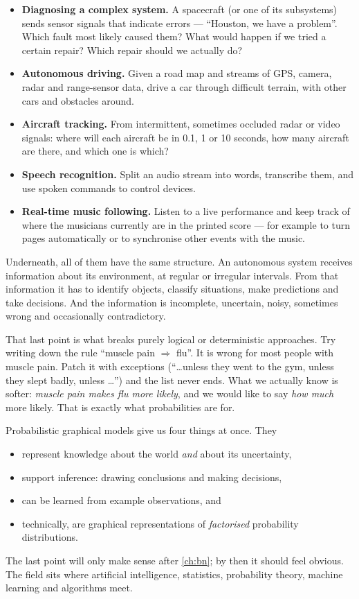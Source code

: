 \documentclass[11pt, oneside]{book}
\begin{document}
\begin{itemize}
  \item \textbf{Diagnosing a complex system.} A spacecraft (or one of its
    subsystems) sends sensor signals that indicate errors --- ``Houston, we
    have a problem''. Which fault most likely caused them? What would happen if
    we tried a certain repair? Which repair should we actually do?
  \item \textbf{Autonomous driving.} Given a road map and streams of GPS,
    camera, radar and range-sensor data, drive a car through difficult terrain,
    with other cars and obstacles around.
  \item \textbf{Aircraft tracking.} From intermittent, sometimes occluded radar
    or video signals: where will each aircraft be in 0.1, 1 or 10 seconds, how
    many aircraft are there, and which one is which?
  \item \textbf{Speech recognition.} Split an audio stream into words,
    transcribe them, and use spoken commands to control devices.
  \item \textbf{Real-time music following.} Listen to a live performance and
    keep track of where the musicians currently are in the printed score ---
    for example to turn pages automatically or to synchronise other events with
    the music.
\end{itemize}

Underneath, all of them have the same structure. An autonomous system receives
information about its environment, at regular or irregular intervals. From
that information it has to identify objects, classify situations, make
predictions and take decisions. And the information is incomplete, uncertain,
noisy, sometimes wrong and occasionally contradictory.

That last point is what breaks purely logical or deterministic approaches. Try
writing down the rule ``muscle pain $\Rightarrow$ flu''. It is wrong for most
people with muscle pain. Patch it with exceptions (``\ldots unless they went to
the gym, unless they slept badly, unless \ldots'') and the list never ends.
What we actually know is softer: \emph{muscle pain makes flu more likely}, and
we would like to say \emph{how much} more likely. That is exactly what
probabilities are for.

Probabilistic graphical models give us four things at once. They
\begin{itemize}
  \item represent knowledge about the world \emph{and} about its uncertainty,
  \item support inference: drawing conclusions and making decisions,
  \item can be learned from example observations, and
  \item technically, are graphical representations of \emph{factorised}
    probability distributions.
\end{itemize}
The last point will only make sense after \cref{ch:bn}; by then it should feel
obvious. The field sits where artificial intelligence, statistics, probability
theory, machine learning and algorithms meet.
\end{document}

